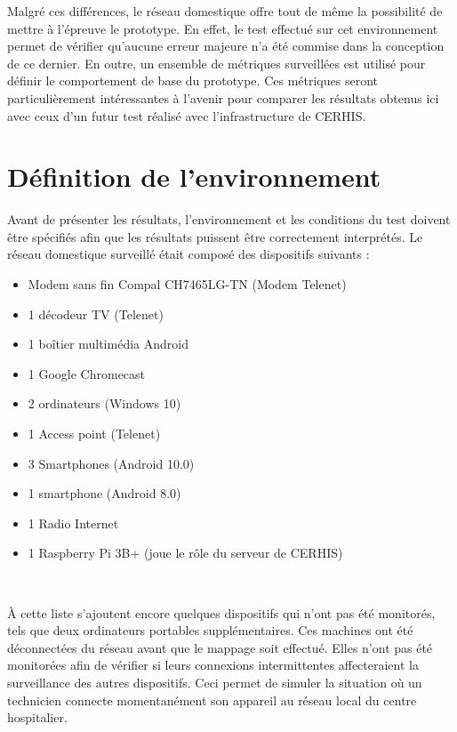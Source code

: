 \noindent
Malgré ces différences, le réseau domestique offre tout de même la possibilité de mettre à l'épreuve le prototype. En effet, le test effectué sur cet environnement permet de vérifier qu'aucune erreur majeure n'a été commise dans la conception de ce dernier. En outre, un ensemble de métriques surveillées est utilisé pour définir le comportement de base du prototype. Ces métriques seront particulièrement intéressantes à l'avenir pour comparer les résultats obtenus ici avec ceux d'un futur test réalisé avec l'infrastructure de CERHIS.

\section{Définition de l'environnement}

\noindent
Avant de présenter les résultats, l'environnement et les conditions du test doivent être spécifiés afin que les résultats puissent être correctement interprétés. Le réseau domestique surveillé était composé des dispositifs suivants :

\begin{itemize}
  \item Modem sans fin Compal CH7465LG-TN (Modem Telenet)
  \item 1 décodeur TV (Telenet)
  \item 1 boîtier multimédia Android
  \item 1 Google Chromecast
  \item 2 ordinateurs (Windows 10)
  \item 1 Access point (Telenet)
  \item 3 Smartphones (Android 10.0)
  \item 1 smartphone (Android 8.0)
  \item 1 Radio Internet
  \item 1 Raspberry Pi 3B+ (joue le rôle du serveur de CERHIS)
\end{itemize}

~

\noindent
À cette liste s'ajoutent encore quelques dispositifs qui n'ont pas été monitorés, tels que deux ordinateurs portables supplémentaires. Ces machines ont été déconnectées du réseau avant que le mappage soit effectué. Elles n'ont pas été monitorées afin de vérifier si leurs connexions intermittentes affecteraient la surveillance des autres dispositifs. Ceci permet de simuler la situation où un technicien connecte momentanément son appareil au réseau local du centre hospitalier.

